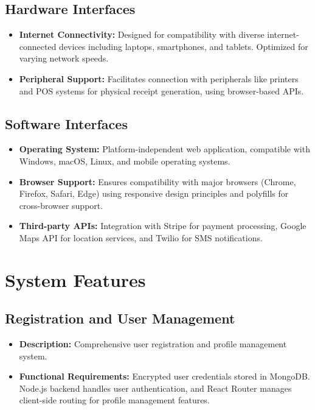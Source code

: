 \documentclass{article}
\begin{document}
\subsection{Hardware Interfaces}
\begin{itemize}
    \item \textbf{Internet Connectivity:} Designed for compatibility with diverse internet-connected devices including laptops, smartphones, and tablets. Optimized for varying network speeds.
    \item \textbf{Peripheral Support:} Facilitates connection with peripherals like printers and POS systems for physical receipt generation, using browser-based APIs.
\end{itemize}

\subsection{Software Interfaces}
\begin{itemize}
    \item \textbf{Operating System:} Platform-independent web application, compatible with Windows, macOS, Linux, and mobile operating systems.
    \item \textbf{Browser Support:} Ensures compatibility with major browsers (Chrome, Firefox, Safari, Edge) using responsive design principles and polyfills for cross-browser support.
    \item \textbf{Third-party APIs:} Integration with Stripe for payment processing, Google Maps API for location services, and Twilio for SMS notifications.
\end{itemize}

\newpage
\section{System Features}
\subsection{Registration and User Management}
\begin{itemize}
    \item \textbf{Description:} Comprehensive user registration and profile management system.
    \item \textbf{Functional Requirements:} Encrypted user credentials stored in MongoDB. Node.js backend handles user authentication, and React Router manages client-side routing for profile management features.
\end{itemize}
\end{document}
